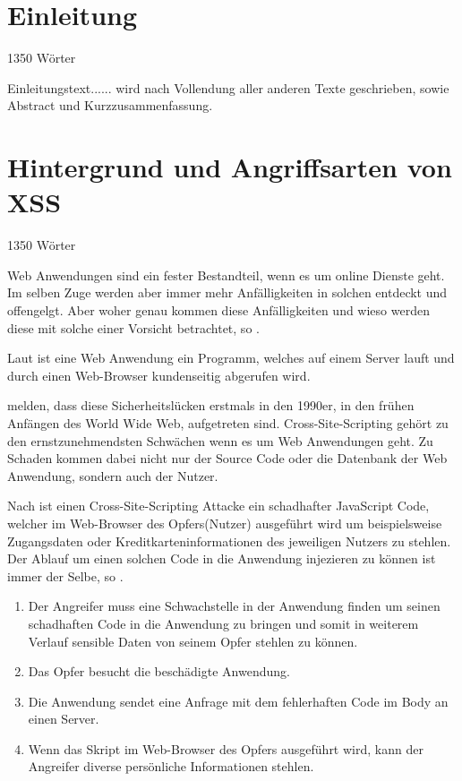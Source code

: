 \section{Einleitung}
\label{section:Introduction} 1350 Wörter

Einleitungstext......
wird nach Vollendung aller anderen Texte geschrieben, sowie Abstract und Kurzzusammenfassung.

\section{Hintergrund und Angriffsarten von XSS}
\label{section:History} 1350 Wörter

Web Anwendungen sind ein fester Bestandteil, wenn es um online Dienste geht. Im selben Zuge werden aber immer mehr Anfälligkeiten in solchen entdeckt und offengelgt. Aber woher genau kommen diese Anfälligkeiten und wieso werden diese mit solche einer Vorsicht betrachtet, so \textcite{kirda2009}.

Laut \textcite[p.1]{mahmoud2017} ist eine Web Anwendung ein Programm, welches auf einem Server lauft und durch einen Web-Browser kundenseitig abgerufen wird.

\textcite[p.2]{hydara2015} melden, dass diese Sicherheitslücken erstmals in den 1990er, in den frühen Anfängen des World Wide Web, aufgetreten sind. Cross-Site-Scripting gehört zu den ernstzunehmendsten Schwächen wenn es um Web Anwendungen geht. Zu Schaden kommen dabei nicht nur der Source Code oder die Datenbank der Web Anwendung, sondern auch der Nutzer.

Nach \textcite[p.1]{mahmoud2017} ist einen Cross-Site-Scripting Attacke ein schadhafter JavaScript Code, welcher im Web-Browser des Opfers(Nutzer) ausgeführt wird um beispielsweise Zugangsdaten oder Kreditkarteninformationen des jeweiligen Nutzers zu stehlen.
Der Ablauf um einen solchen Code in die Anwendung injezieren zu können ist immer der Selbe, so \textcite{mahmoud2017}.
\begin{enumerate}
	\item Der Angreifer muss eine Schwachstelle in der Anwendung finden um seinen schadhaften Code in die Anwendung zu bringen und somit in weiterem Verlauf sensible Daten von seinem Opfer stehlen zu können.
	\item Das Opfer besucht die beschädigte Anwendung.
	\item Die Anwendung sendet eine Anfrage mit dem fehlerhaften Code im Body an einen Server.
	\item Wenn das Skript im Web-Browser des Opfers ausgeführt wird, kann der Angreifer diverse persönliche Informationen stehlen.
\end{enumerate}

